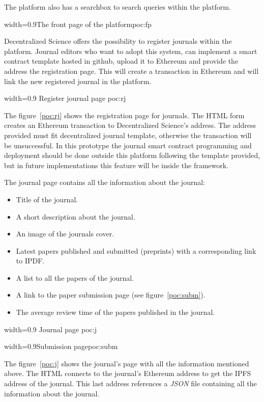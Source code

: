 The platform also has a searchbox to search queries within the platform.

 {width=0.9\linewidth}{The front page of the
  platform}{poc:fp}


Decentralized Science offers the possibility to register journals within the
platform. Journal editors who want to adopt this system, can implement a smart
contract template hosted in github, upload it to Ethereum and provide the
address the registration page. This will create a transaction in Ethereum and
will link the new registered journal in the platform.

%
{width=0.9\linewidth}%
{Register journal page}%
{poc:rj}

The figure~\ref{poc:rj} shows the registration page for journals. The HTML form
creates an Ethereum transaction to Decentralized Science's address. The address
provided must fit decentralized journal template, otherwise the transaction will
be unsuccessful. In this prototype the journal smart contract programming and
deployment should be done outside this platform following the template provided,
but in future implementations this feature will be inside the framework.


The journal page contains all the information about the journal:
\begin{itemize}
\item Title of the journal.
\item A short description about the journal.
\item An image of the journals cover.
\item Latest papers published and submitted (preprints) with a corresponding
  link to IPDF.
 \item A list to all the papers of the  journal.
\item A link to the paper submission page (see figure~\ref{poc:subm}).
\item The average review time of the papers published in the journal.
\end{itemize}

%
{width=0.9\linewidth}%
{Journal page}%
{poc:j}

 {width=0.9\linewidth}{Submission page}{poc:subm}

The figure~\ref{poc:j} shows the journal's page with all the information
mentioned above. The HTML connects to the journal's Ethereum address to get the
IPFS address of the journal. This last address references a \emph{JSON} file
containing all the information about the journal.


